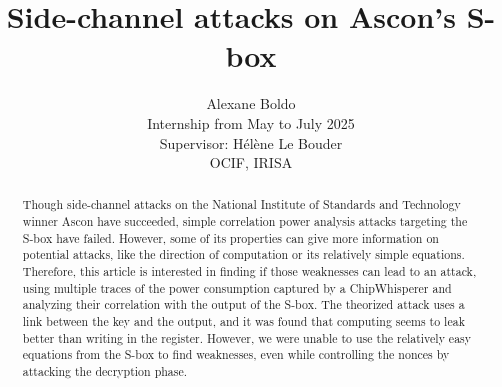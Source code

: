 \documentclass[11pt,technote]{IEEEtran}
\author{
		Alexane Boldo\\
		Internship from May to July 2025\\
		Supervisor: Hélène Le Bouder\\
		OCIF, IRISA
	}
\title{Side-channel attacks on Ascon's S-box}
\date{}
\begin{document}
		\maketitle
		
		\begin{abstract}
			Though side-channel attacks on the National Institute of Standards and Technology winner Ascon have succeeded, simple correlation power analysis attacks targeting the S-box have failed. However, some of its properties can give more information on potential attacks, like the direction of computation or its relatively simple equations. Therefore, this article is interested in finding if those weaknesses can lead to an attack, using multiple traces of the power consumption captured by a ChipWhisperer and analyzing their correlation with the output of the S-box. The theorized attack uses a link between the key and the output, and it was found that computing seems to leak better than writing in the register. However, we were unable to use the relatively easy equations from the S-box to find weaknesses, even while controlling the nonces by attacking the decryption phase.
		\end{abstract}
		
		
\end{document}

